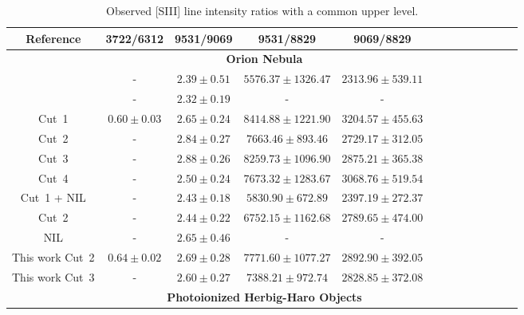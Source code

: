 \documentclass[fleqn,usenatbib]{mnras}
\begin{document}
\begin{table}
\centering
\caption{Observed [S\thinspace III] line intensity ratios with a common upper level.}
\label{tab:atomic_data_test}
\begin{tabular}{ccccccccccccc}
\hline
Reference & 3722/6312 & 9531/9069 & 9531/8829 &9069/8829 \\
\hline

 & \multicolumn{4}{c}{{\bf Orion Nebula}}\\

\citet{Esteban04} & - & $2.39 \pm 0.51$ & $5576.37 \pm 1326.47$ & $2313.96 \pm 539.11$\\

\citet{mesadelgado09} & - & $2.32 \pm 0.19$ & - & - \\

\citet{mendez2021} Cut~1 & $0.60 \pm 0.03$ & $2.65 \pm 0.24$ & $8414.88 \pm 1221.90$ & $3204.57 \pm 455.63$\\

\citet{mendez2021} Cut~2 & - &$2.84 \pm 0.27$ & $7663.46 \pm 893.46$& $2729.17 \pm 312.05$\\

\citet{mendez2021} Cut~3 & - &$2.88 \pm 0.26$&$8259.73 \pm 1096.90$&$2875.21 \pm 365.38$\\

\citet{mendez2021} Cut~4 & - &$2.50 \pm 0.24$&$7673.32 \pm 1283.67$ & $3068.76 \pm 519.54$ \\

 
\citet{mendez2021-2} Cut~1 + NIL & - & $2.43 \pm 0.18$ &$5830.90 \pm 672.89$&$2397.19 \pm 272.37$ \\

\citet{mendez2021-2} Cut~2 & - & $2.44 \pm 0.22$ & $6752.15 \pm 1162.68$& $2789.65 \pm 474.00$ \\

\citet{mendez2021-2} NIL & - &$2.65 \pm 0.46$ &-&- \\

This work Cut~2 & $0.64 \pm 0.02$ & $2.69 \pm 0.28$ & $7771.60 \pm 1077.27$ & $2892.90 \pm 392.05$\\


This work Cut~3 & - & $2.60 \pm 0.27$ & $7388.21 \pm 972.74$ & $2828.85 \pm 372.08$\\


& \multicolumn{4}{c}{{\bf Photoionized Herbig-Haro Objects}}\\


\end{tabular}
\end{table}
\end{document}
